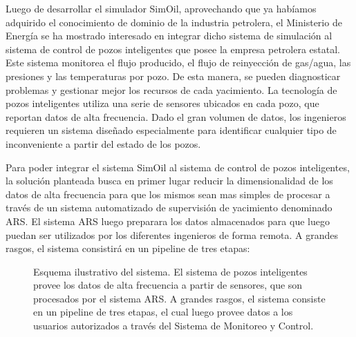 \documentclass{article}
\theoremstyle{definition}
\theoremstyle{remark}
\begin{document}
Luego de desarrollar el simulador SimOil, aprovechando que ya habíamos adquirido el conocimiento de dominio de la industria petrolera, el Ministerio de Energía se ha mostrado interesado en integrar dicho sistema de simulación al sistema de control de pozos inteligentes que posee la empresa petrolera estatal. Este sistema monitorea el flujo producido, el flujo de reinyección de gas/agua, las presiones y las temperaturas por pozo. De esta manera, se pueden diagnosticar problemas y gestionar mejor los recursos de cada yacimiento. La tecnología de pozos inteligentes utiliza una serie de sensores ubicados en cada pozo, que reportan datos de alta frecuencia. Dado el gran volumen de datos, los ingenieros requieren un sistema diseñado especialmente para identificar cualquier tipo de inconveniente a partir del estado de los pozos.

Para poder integrar el sistema SimOil al sistema de control de pozos inteligentes, la solución planteada busca en primer lugar reducir la dimensionalidad de los datos de alta frecuencia para que los mismos sean mas simples de procesar a través de un sistema automatizado de supervisión de yacimiento denominado ARS. El sistema ARS luego preparara los datos almacenados para que luego puedan ser utilizados por los diferentes ingenieros de forma remota. A grandes rasgos, el sistema consistirá en un pipeline de tres etapas:

\begin{figure}[H]
  \caption{Esquema ilustrativo del sistema. El sistema de pozos inteligentes provee los datos de alta frecuencia a partir de sensores, que son procesados por el sistema ARS. A grandes rasgos, el sistema consiste en un pipeline de tres etapas, el cual luego provee datos a los usuarios autorizados a través del Sistema de Monitoreo y Control.}
\end{figure}
\end{document}
